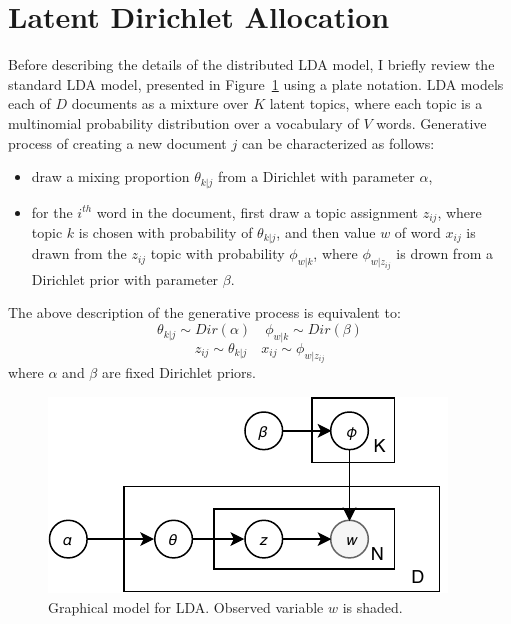 \documentclass[journal]{IEEEtran}
\begin{document}
\section{Latent Dirichlet Allocation}
\label{sec:lda}
Before describing the details of the distributed LDA model, I briefly review the standard LDA model, presented in Figure~\ref{fig:lda} using a plate notation.  LDA models each of $D$ documents as a mixture over $K$ latent topics, where each topic is a multinomial probability distribution over a vocabulary of $V$ words. Generative process of creating a new document $j$ can be characterized as follows:
\begin{itemize}
\item draw a mixing proportion $\theta_{k|j}$ from a Dirichlet with parameter $\alpha$,
\item for the $i^{th}$ word in the document, first draw a topic assignment $z_{ij}$, where topic $k$ is chosen with probability of $\theta_{k|j}$, and then value $w$ of word $x_{ij}$ is drawn from the $z_{ij}$ topic with probability $\phi_{w|k}$, where $\phi_{w|z_{ij}}$ is drown from a Dirichlet prior with parameter $\beta$.
\end{itemize}
The above description of the generative process is equivalent to:
$$
\theta_{k|j}\sim Dir(\alpha) \quad \phi_{w|k}\sim Dir(\beta)
$$
$$z_{ij}\sim \theta_{k|j} \quad  x_{ij}\sim \phi_{w|z_{ij}}
$$
where $\alpha$ and $\beta$ are fixed Dirichlet priors.

\begin{figure}
\centering
\includegraphics[scale=0.9]{plots/LDA.pdf}
\caption{Graphical model for LDA. Observed variable $w$ is shaded.}
\label{fig:lda}
\end{figure}
\end{document}
